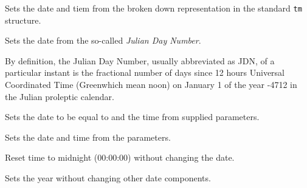 
Sets the date and tiem from the broken down representation in the standard
{\tt tm} structure.


\label{wxdatetimesetjdn}


Sets the date from the so-called {\it Julian Day Number}.

By definition, the Julian Day Number, usually abbreviated as JDN, of a
particular instant is the fractional number of days since 12 hours Universal
Coordinated Time (Greenwhich mean noon) on January 1 of the year -4712 in the
Julian proleptic calendar.


\label{wxdatetimesettime}


Sets the date to be equal to  and the time
from supplied parameters.


\label{wxdatetimesetdate}


Sets the date and time from the parameters.

\label{wxdatetimeresettime}


Reset time to midnight (00:00:00) without changing the date.

\label{wxdatetimesetyear}


Sets the year without changing other date components.

\label{wxdatetimesetmonth}

